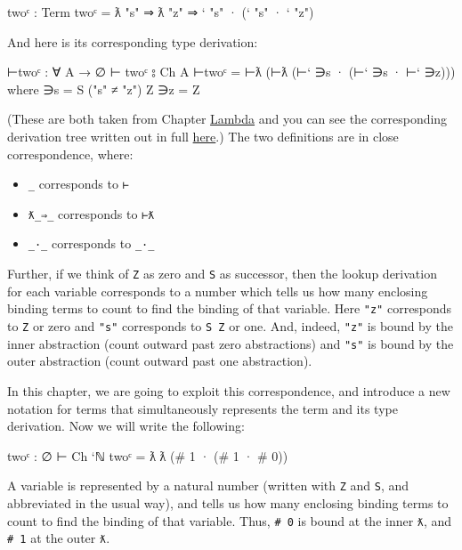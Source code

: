 \begin{myDisplay}
twoᶜ : Term
twoᶜ = ƛ "s" ⇒ ƛ "z" ⇒ ` "s" · (` "s" · ` "z")
\end{myDisplay}

And here is its corresponding type derivation:

\begin{myDisplay}
⊢twoᶜ : ∀ {A} → ∅ ⊢ twoᶜ ⦂ Ch A
⊢twoᶜ = ⊢ƛ (⊢ƛ (⊢` ∋s · (⊢` ∋s · ⊢` ∋z)))
  where
  ∋s = S ("s" ≠ "z") Z
  ∋z = Z
\end{myDisplay}

(These are both taken from Chapter \protect\hyperlink{Lambda}{Lambda}
and you can see the corresponding derivation tree written out in full
\protect\hyperlink{Lambda-derivation}{here}.) The two definitions are in
close correspondence, where:

\begin{itemize}
\tightlist
\item
  \texttt{\textasciigrave{}\_} corresponds to
  \texttt{⊢\textasciigrave{}}
\item
  \texttt{ƛ\_⇒\_} corresponds to \texttt{⊢ƛ}
\item
  \texttt{\_·\_} corresponds to \texttt{\_·\_}
\end{itemize}

Further, if we think of \texttt{Z} as zero and \texttt{S} as successor,
then the lookup derivation for each variable corresponds to a number
which tells us how many enclosing binding terms to count to find the
binding of that variable. Here \texttt{"z"} corresponds to \texttt{Z} or
zero and \texttt{"s"} corresponds to \texttt{S\ Z} or one. And, indeed,
\texttt{"z"} is bound by the inner abstraction (count outward past zero
abstractions) and \texttt{"s"} is bound by the outer abstraction (count
outward past one abstraction).

In this chapter, we are going to exploit this correspondence, and
introduce a new notation for terms that simultaneously represents the
term and its type derivation. Now we will write the following:

\begin{myDisplay}
twoᶜ  :  ∅ ⊢ Ch `ℕ
twoᶜ  =  ƛ ƛ (# 1 · (# 1 · # 0))
\end{myDisplay}

A variable is represented by a natural number (written with \texttt{Z}
and \texttt{S}, and abbreviated in the usual way), and tells us how many
enclosing binding terms to count to find the binding of that variable.
Thus, \texttt{\#\ 0} is bound at the inner \texttt{ƛ}, and
\texttt{\#\ 1} at the outer \texttt{ƛ}.

